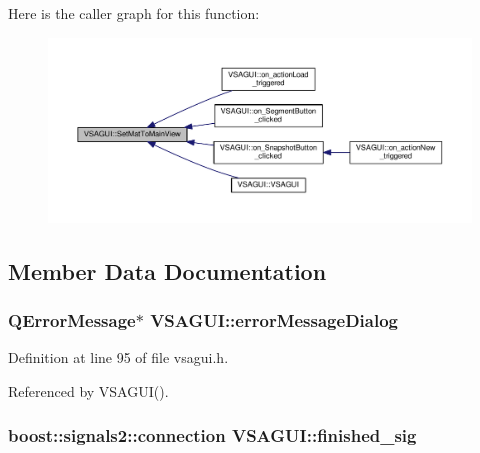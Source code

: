 Here is the caller graph for this function\+:\nopagebreak
\begin{figure}[H]
\begin{center}
\leavevmode
\includegraphics[width=350pt]{class_v_s_a_g_u_i_a988508cf880e27fcd8a029b94e546bcc_icgraph}
\end{center}
\end{figure}




\subsection{Member Data Documentation}
\hypertarget{class_v_s_a_g_u_i_af01408e987e5df2ce336ee8447841c1f}{}
\subsubsection[{error\+Message\+Dialog}]{\setlength{\rightskip}{0pt plus 5cm}Q\+Error\+Message$\ast$ V\+S\+A\+G\+U\+I\+::error\+Message\+Dialog\hspace{0.3cm}{\ttfamily [private]}}\label{class_v_s_a_g_u_i_af01408e987e5df2ce336ee8447841c1f}


Definition at line 95 of file vsagui.\+h.



Referenced by V\+S\+A\+G\+U\+I().

\hypertarget{class_v_s_a_g_u_i_a670325c6bab3874937f0a9b7e8e3b370}{}
\subsubsection[{finished\+\_\+sig}]{\setlength{\rightskip}{0pt plus 5cm}boost\+::signals2\+::connection V\+S\+A\+G\+U\+I\+::finished\+\_\+sig\hspace{0.3cm}{\ttfamily [private]}}\label{class_v_s_a_g_u_i_a670325c6bab3874937f0a9b7e8e3b370}


